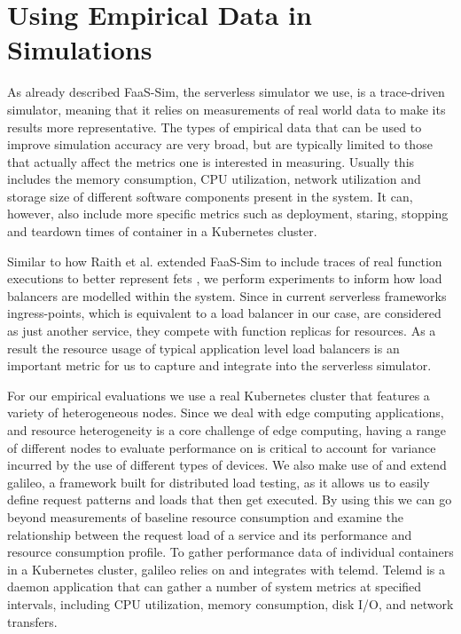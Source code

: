 \section{Using Empirical Data in Simulations}
As already described FaaS-Sim\cite{faas-sim-github}, the serverless simulator we use, is a trace-driven simulator\cite{thomas-thesis}, meaning that it relies on measurements of real world data to make its results more representative.
The types of empirical data that can be used to improve simulation accuracy are very broad, but are typically limited to those that actually affect the metrics one is interested in measuring.
Usually this includes the memory consumption, CPU utilization, network utilization and storage size of different software components present in the system.
It can, however, also include more specific metrics such as deployment, staring, stopping and teardown times of container in a Kubernetes cluster\cite{skippy}.

Similar to how Raith et al. extended FaaS-Sim to include traces of real function executions to better represent \glspl{fet} \cite{philipp-da}, we perform experiments to inform how load balancers are modelled within the system.
Since in current serverless frameworks ingress-points, which is equivalent to a load balancer in our case, are considered as just another service, they compete with function replicas for resources.
As a result the resource usage of typical application level load balancers is an important metric for us to capture and integrate into the serverless simulator.

For our empirical evaluations we use a real Kubernetes cluster that features a variety of heterogeneous nodes.
Since we deal with edge computing applications, and resource heterogeneity is a core challenge of edge computing\cite{shiEdgeComputingVisionChallenges2016}, having a range of different nodes to evaluate performance on is critical to account for variance incurred by the use of different types of devices.
We also make use of and extend galileo\cite{galileo-github}\cite{operating-energy-aware-galileo}, a framework built for distributed load testing, as it allows us to easily define request patterns and loads that then get executed.
By using this we can go beyond measurements of baseline resource consumption and examine the relationship between the request load of a service and its performance and resource consumption profile.
To gather performance data of individual containers in a Kubernetes cluster, galileo relies on and integrates with telemd\cite{telemd-github}.
Telemd is a daemon application that can gather a number of system metrics at specified intervals, including CPU utilization, memory consumption, disk I/O, and network transfers.


%
%